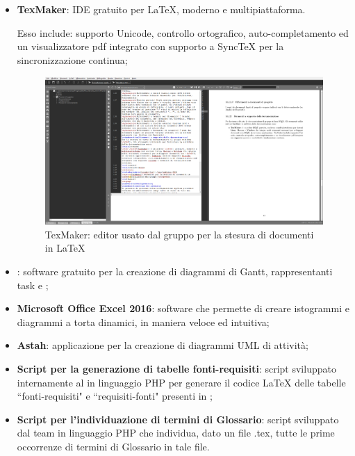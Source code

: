 			\begin{itemize}
				\item \textbf{TexMaker}:
					IDE gratuito per \LaTeX{}, moderno e multipiattaforma.

					Esso include: supporto Unicode, controllo ortografico, auto-completamento ed un visualizzatore pdf integrato
					con supporto a SyncTeX per la sincronizzazione continua;

					\begin{figure}[htbp]
						\centering
						\includegraphics[scale=0.3]{./img/texMaker.png}
						\caption[TexMaker]{TexMaker: editor usato dal gruppo per la stesura di documenti in \LaTeX{}}
					\end{figure}

				\item \textbf{}:
					software gratuito per la creazione di diagrammi di Gantt, rappresentanti task e ;
				\item \textbf{Microsoft Office Excel 2016}:
					software che permette di creare istogrammi e diagrammi a torta dinamici, in maniera veloce ed intuitiva;
				\item \textbf{Astah}:
					applicazione per la creazione di diagrammi UML di attività;
				\item \textbf{Script per la generazione di tabelle fonti-requisiti}:
					script sviluppato internamente al  in linguaggio PHP per generare il codice \LaTeX{} delle
					tabelle ``fonti-requisiti" e	``requisiti-fonti" presenti in \vAnalisiDeiRequisiti{};
				\item \textbf{Script per l'individuazione di termini di Glossario}:
					script sviluppato dal team in linguaggio PHP che individua, dato un file .tex, tutte le prime occorrenze di termini
					di Glossario in tale file.
			\end{itemize}
